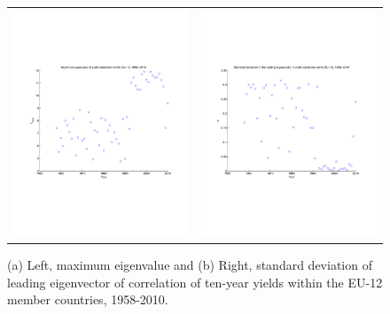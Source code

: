 \documentclass[3p]{elsarticle}
\begin{document}
\begin{figure}[ht!]
	\centering
	\begin{tabular}{cc}
		\includegraphics[width=7cm]{fig_maxeig_eu12} & \includegraphics[width=7cm]{fig_maxeigstd_eu12}
	\end{tabular}
	\caption{(a) Left, maximum eigenvalue and (b) Right, standard deviation of leading eigenvector of correlation of ten-year yields within the EU-12 member countries, 1958-2010.}
	\label{fig:maxeig_eu12}
\end{figure}
\end{document}
